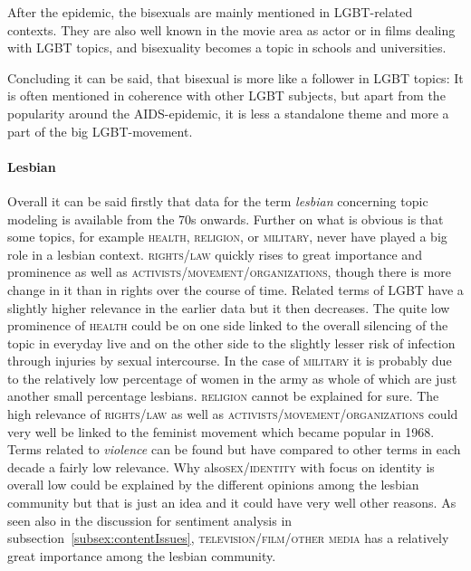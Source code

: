 \documentclass[10pt,a4paper,twocolumn]{scrartcl}
\begin{document}
After the epidemic, the bisexuals are mainly mentioned in LGBT-related contexts. They are also well known in the movie area as actor or in films dealing with LGBT topics, and bisexuality becomes a topic in schools and universities.

Concluding it can be said, that bisexual is more like a follower in LGBT topics: It is often mentioned in coherence with other LGBT subjects, but apart from the popularity around the AIDS-epidemic, it is less a standalone theme and more a part of the big LGBT-movement.

\paragraph*{Lesbian} Overall it can be said firstly that data for the term \textit{lesbian} concerning topic modeling is available from the 70s onwards. Further on what is obvious is that some topics, for example \textsc{health}, \textsc{religion}, or \textsc{military}, never have played a big role in a lesbian context. \textsc{rights/law} quickly rises to great importance and prominence as well as \textsc{activists/movement/organizations}, though there is more change in it than in rights over the course of time. Related terms of LGBT have a slightly higher relevance in the earlier data but it then decreases. The quite low prominence of \textsc{health} could be on one side linked to the overall silencing of the topic in everyday live and on the other side to the slightly lesser risk of infection through injuries by sexual intercourse. In the case of \textsc{military} it is probably due to the relatively low percentage of women in the army as whole of which are just another small percentage lesbians. \textsc{religion} cannot be explained for sure. The high relevance of \textsc{rights/law} as well as \textsc{activists/movement/organizations} could very well be linked to the feminist movement which became popular in 1968. Terms related to \textit{violence} can be found but have compared to other terms in each decade a fairly low relevance. Why also\textsc{sex/identity} with focus on identity is overall low could be explained by the different opinions among the lesbian community but that is just an idea and it could have very well other reasons. As seen also in the discussion for sentiment analysis in subsection~\ref{subsex:contentIssues}, \textsc{television/film/other media} has a relatively great importance among the lesbian community.
\end{document}
